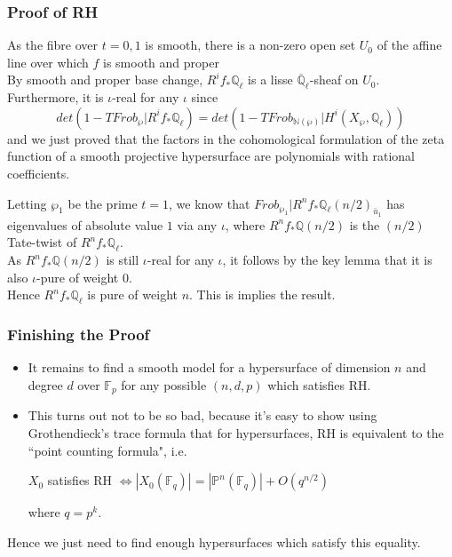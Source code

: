 \documentclass{beamer}
\begin{document}
\begin{frame}
\frametitle{Proof of RH}
As the fibre over $t=0,1$ is smooth, there is a non-zero open set $U_{0}$ of the affine line over which $f$ is smooth and proper\\ \vspace{2mm}
\pause
By smooth and proper base change, $R^{i}f_{*}\mathbb{Q}_{\ell}$ is a lisse $\overline{\mathbb{Q}}_{\ell}$-sheaf on $U_0$. Furthermore, it is $\iota$-real for any $\iota$ since 
$$det(1-TFrob_{\wp}|R^{i}f_{*}\mathbb{Q}_{\ell}) = det(1-TFrob_{\mathbb{N}(\wp)}|H^{i}(X_{\wp},\mathbb{Q}_{\ell}))$$
\pause
\noindent and we just proved that the factors in the cohomological formulation of the zeta function of a smooth projective hypersurface are polynomials with rational coefficients.  

\end{frame}

\begin{frame}
\pause
Letting $\wp_{1}$ be the prime $t=1$, we know that $Frob_{\wp_{1}}|R^{n}f_{*}\mathbb{Q}_{\ell}(n/2)_{\bar{u}_1}$ has eigenvalues of absolute value $1$ via any $\iota$, where $R^{n}f_{*}\mathbb{Q}(n/2)$ is the $(n/2)$ Tate-twist of $R^{n}f_{*}\mathbb{Q}_{\ell}$.\vspace{1cm} \\
\pause
As $R^{n}f_{*}\mathbb{Q}(n/2)$ is still $\iota$-real for any $\iota$, it follows by the key lemma that it is also $\iota$-pure of weight $0$.\vspace{1cm} \\
\pause 
Hence $R^{n}f_{*}\mathbb{Q}_{\ell}$ is pure of weight $n$. This is implies the result.
\end{frame}

\begin{frame}[fragile]
\frametitle{Finishing the Proof}
\pause
\begin{itemize}
\item It remains to find a smooth model for a hypersurface of dimension $n$ and degree $d$ over $\mathbb{F}_{p}$ for any possible $(n,d,p)$ which satisfies RH. 
\pause
\item This turns out not to be so bad, because it's easy to show using Grothendieck's trace formula that for hypersurfaces, RH is equivalent to the ``point counting formula", i.e.
\pause
\begin{center}

$X_{0}$ satisfies RH $\Leftrightarrow |X_{0}(\mathbb{F}_{q})| = |\mathbb{P}^{n}(\mathbb{F}_{q})| + O(q^{n/2})$
\end{center}
where $q=p^{k}$. 
\pause

\end{itemize}
Hence we just need to find enough hypersurfaces which satisfy this equality.
\end{frame}
\end{document}
